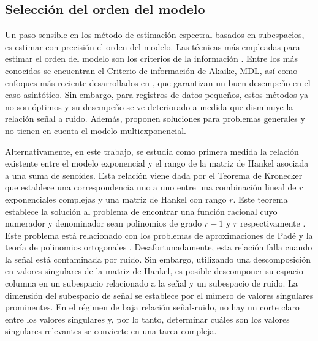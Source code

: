 \subsection{Selección del orden del modelo}

Un paso sensible en los método de estimación espectral basados en subespacios, es estimar con precisión el orden del modelo.  Las técnicas más empleadas para estimar el orden del modelo son los criterios de la información \cite{Stoica2004}. Entre los más conocidos se encuentran el Criterio de información de Akaike, MDL, así como enfoques más reciente desarrollados en \cite{Mariani2015, Nielsen2013}, que garantizan un buen desempeño en el caso asintótico. Sin embargo, para registros de datos pequeños, estos métodos ya no son óptimos y su desempeño se ve deteriorado a medida que disminuye la relación señal a ruido. Además, proponen soluciones para problemas generales y no tienen en cuenta el modelo multiexponencial. 

Alternativamente, en este trabajo, se estudia como primera medida la relación existente entre el modelo exponencial y el rango de la matriz de Hankel asociada a una suma de senoides. Esta relación viene dada por el Teorema de Kronecker \cite{Gantmacher1960} que establece una correspondencia uno a uno entre una combinación lineal de $r$ exponenciales complejas y una matriz de Hankel con rango $r$. Este teorema establece la solución al problema de encontrar una función racional cuyo numerador y denominador sean polinomios de grado $r-1$ y $r$ respectivamente  \cite{Fuhrmann2011}. Este problema está relacionado con los problemas de aproximaciones de Padé \cite{Gonnet2013} y la teoría de polinomios ortogonales \cite{Szego1939}. Desafortunadamente, esta relación falla cuando la señal está contaminada por ruido. Sin embargo, utilizando una descomposición en valores singulares de la matriz de Hankel, es posible descomponer su espacio columna en un subespacio relacionado a la señal y un subespacio de ruido. La dimensión del subespacio de señal se establece por el número de valores singulares prominentes. En el régimen de baja relación señal-ruido, no hay un corte claro entre los valores singulares y, por lo tanto, determinar cuáles son los valores singulares relevantes se convierte en una tarea compleja. 

